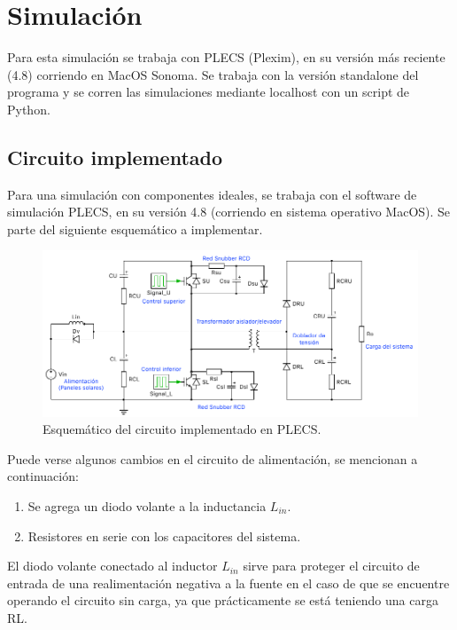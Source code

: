 \clearpage


\section{Simulación}

Para esta simulación se trabaja con PLECS (Plexim), en su versión más reciente (4.8) corriendo en MacOS Sonoma. Se trabaja con la versión standalone del programa y se corren las simulaciones mediante localhost con un script de Python.

\subsection{Circuito implementado}

Para una simulación con componentes ideales, se trabaja con el software de simulación PLECS, en su versión 4.8 (corriendo en sistema operativo MacOS). Se parte del siguiente esquemático a implementar. 

\begin{figure}
	\centering
	\includegraphics[width=1\linewidth]{img/schematic}
	\caption{Esquemático del circuito implementado en PLECS.}
	\label{fig:schematic}
\end{figure}

Puede verse algunos cambios en el circuito de alimentación, se mencionan a continuación:

\begin{enumerate}
	\item Se agrega un diodo volante a la inductancia $L_{in}$.
	\item Resistores en serie con los capacitores del sistema.
\end{enumerate}

El diodo volante conectado al inductor $L_{in}$ sirve para proteger el circuito de entrada de una realimentación negativa a la fuente en el caso de que se encuentre operando el circuito sin carga, ya que prácticamente se está teniendo una carga RL.

